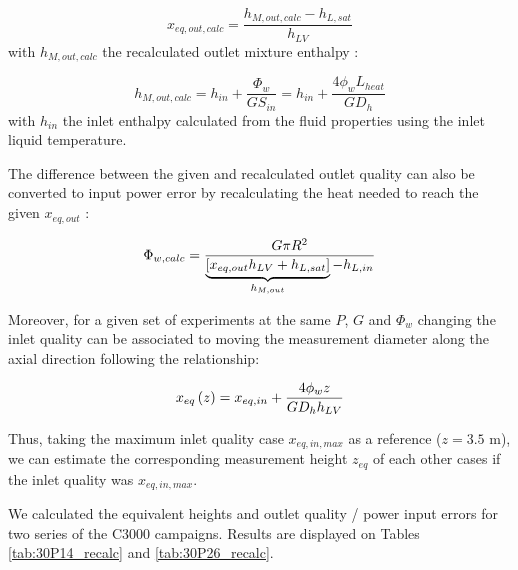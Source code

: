 \begin{equation}
x_{eq,out,calc} = \frac{h_{M,out,calc} - h_{L,sat}}{h_{LV}}
\label{eq:xeq_out}
\end{equation}
with $h_{M,out,calc}$ the recalculated outlet mixture enthalpy :

\begin{equation}
h_{M,out,calc} = h_{in} + \frac{\Phi_{w}}{G S_{in}} = h_{in} + \frac{4\phi_{w}L_{heat}}{G D_{h}}
\end{equation}
with $h_{in}$ the inlet enthalpy calculated from the fluid properties using the inlet liquid temperature.

\npar
The difference between the given and recalculated outlet quality can also be converted to input power error by recalculating the heat needed to reach the given $x_{eq,out}$ :

\begin{equation}
\Phi_{w,calc} = \frac{G  \pi R^{2}}{\underbrace{\left[ x_{eq,out}h_{LV}+h_{L,sat} \right]}_{h_{M,out}} - h_{L,in}}
\end{equation}

\npar 


Moreover, for a given set of experiments at the same $P$, $G$ and $\Phi_{w}$ changing the inlet quality can be associated to moving the measurement diameter along the axial direction following the relationship: 

\begin{equation}
x_{eq}\left( z \right) = x_{eq,in} + \frac{4 \phi_{w} z }{G D_{h} h_{LV}}
\end{equation}

Thus, taking the maximum inlet quality case $x_{eq,in, max}$ as a reference ($z=3.5$ m), we can estimate the corresponding measurement height $z_{eq}$ of each other cases if the inlet quality was $x_{eq,in, max}$.

\npar

We calculated the equivalent heights and outlet quality / power input errors for two series of the C3000 campaigns. Results are displayed on Tables \ref{tab:30P14_recalc} and \ref{tab:30P26_recalc}.



